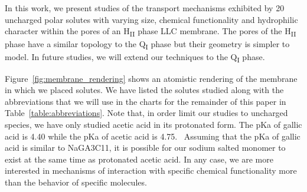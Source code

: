 \documentclass[journal=jpcbfk,manuscript=article]{achemso}
\begin{document}
  In this work, we present studies of the transport mechanisms exhibited by 20
  uncharged polar solutes with varying size, chemical functionality and
  hydrophilic character within the pores of an H\textsubscript{II} phase LLC
  membrane. The pores of the H\textsubscript{II} phase have a similar topology to
  the Q\textsubscript{I} phase but their geometry is simpler to model. In future
  studies, we will extend our techniques to the Q\textsubscript{I} phase. 

  Figure~\ref{fig:membrane_rendering} shows an atomistic rendering of the
  membrane in which we placed solutes. We have listed the solutes studied along
  with the abbreviations that we will use in the charts for the remainder of this
  paper in Table~\ref{table:abbreviations}. Note that, in order limit our
  studies to uncharged species, we have only studied acetic acid in its
  protonated form. The pKa of gallic acid is 4.40 while the pKa of acetic acid is
  4.75.~\cite{chuysinuan_gallic_2009,perrin_pka_1981} Assuming that the pKa of
  gallic acid is similar to NaGA3C11, it is possible for our sodium salted
  monomer to exist at the same time as protonated acetic acid. In any case, we
  are more interested in mechanisms of interaction with specific chemical
  functionality more than the behavior of specific molecules.
\end{document}

